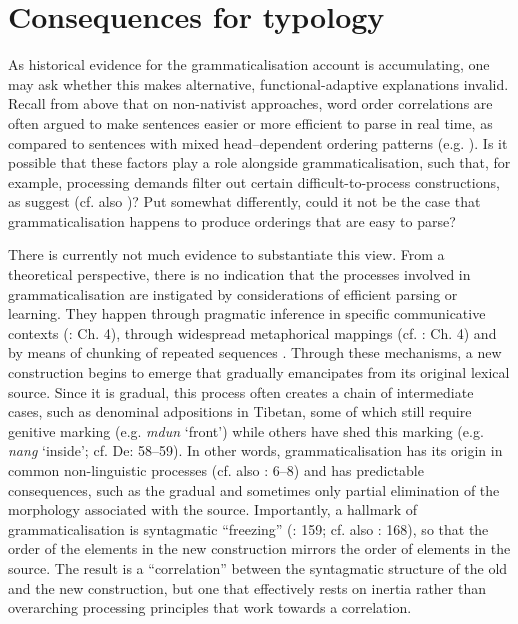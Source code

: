 \documentclass[output=paper]{langsci/langscibook}
\begin{document}
\section{Consequences for typology}

As historical evidence for the grammaticalisation account is accumulating, one may ask whether this makes alternative, functional-adaptive explanations invalid. Recall from above that on non-nativist approaches, word order correlations are often argued to make sentences easier or more efficient to parse in real time, as compared to sentences with mixed head–dependent ordering patterns (e.g. \citealt{Hawkins2004}). Is it possible that these factors play a role alongside grammaticalisation, such that, for example, processing demands filter out certain difficult-to-process constructions, as \citet{KirbyHurford1997} suggest (cf. also \citealt{Christiansen2000})? Put somewhat differently, could it not be the case that grammaticalisation happens to produce orderings that are easy to parse?

There is currently not much evidence to substantiate this view. From a theoretical perspective, there is no indication that the processes involved in grammaticalisation are instigated by considerations of efficient parsing or learning. They happen through pragmatic inference in specific communicative contexts (\citealt{HopperTraugott2003}: Ch. 4), through widespread metaphorical mappings (cf. \citealt{Deutscher2005}: Ch. 4) and by means of chunking of repeated sequences \citep{Bybee2002}. Through these mechanisms, a new construction begins to emerge that gradually emancipates from its original lexical source. Since it is gradual, this process often creates a chain of intermediate cases, such as denominal adpositions in Tibetan, some of which still require genitive marking (e.g. \textit{mdun} ‘front’) while others have shed this marking (e.g. \textit{nang} ‘inside’; cf. De\citealt{Lancey1997}: 58–59). In other words, grammaticalisation has its origin in common non-linguistic processes (cf. also \citealt{Bybee2010}: 6–8) and has predictable consequences, such as the gradual and sometimes only partial elimination of the morphology associated with the source. Importantly, a hallmark of grammaticalisation is syntagmatic “freezing” (\citealt{Croft2000}: 159; cf. also \citealt{Lehmann2015}: 168), so that the order of the elements in the new construction mirrors the order of elements in the source. The result is a “correlation” between the syntagmatic structure of the old and the new construction, but one that effectively rests on inertia rather than overarching processing principles that work towards a correlation.
\end{document}
